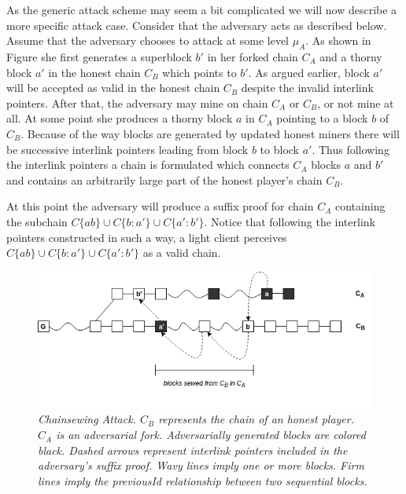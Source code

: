 As the generic attack scheme may seem a bit complicated we will now describe a more
specific attack case. Consider that the adversary acts as described below.
Assume that the adversary chooses to attack at some level $\mu_A$. As shown in Figure %
she first generates a superblock $b'$ in her forked chain $C_A$ and a thorny block $a'$ in the honest chain $C_B$ which points to $b'$. 
As argued earlier, block $a'$ will be accepted as valid in the honest chain $C_B$ 
despite the invalid interlink pointers. After that, the adversary may mine on chain
$C_A$ or $C_B$, or not mine at all. At some point she produces a thorny block $a$ 
in $C_A$ pointing to a block $b$ of $C_B$. Because of the way blocks are generated
by updated honest miners there will be successive interlink pointers leading
from block $b$ to block $a'$. Thus following the interlink pointers a chain is
formulated which connects $C_A$ blocks $a$ and $b'$ and contains an arbitrarily
large part of the honest player's chain $C_B$.

At this point the adversary will produce a suffix proof for chain $C_A$ containing
the subchain $C\{ab\} \cup C\{b:a'\} \cup C\{a':b'\}$. Notice that following the
interlink pointers constructed in such a way, a light client perceives $C\{ab\} \cup C\{b:a'\} \cup C\{a':b'\}$  as a valid chain.

\begin{figure}[h!]
	\begin{center}
		\includegraphics[scale=0.4]{figures/chainsewing_attack.png}
	\end{center}
	\caption{\textit{Chainsewing Attack. $C_B$ represents the chain of an honest
	player. $C_A$ is an adversarial fork. Adversarially generated blocks are colored
	black. Dashed arrows represent	interlink pointers included in the adversary's
	suffix proof. Wavy lines imply one or more blocks. Firm lines imply the previousId 
	relationship between two sequential blocks.}}
	\label{fig:attack}
\end{figure}

